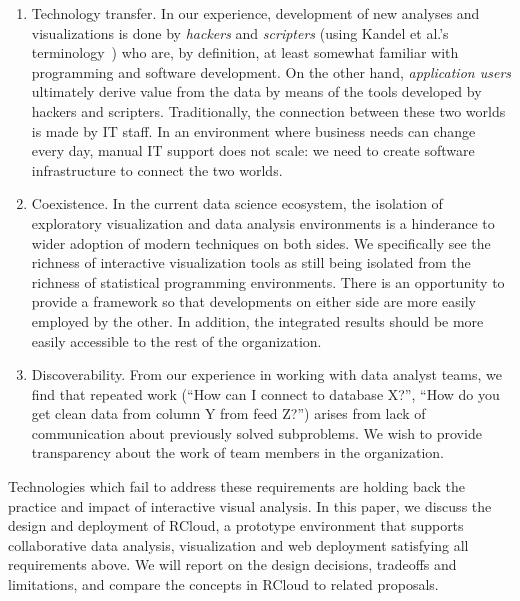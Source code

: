 \begin{enumerate}

\item Technology transfer. In our experience, development
of new analyses and visualizations is done by \emph{hackers}
and \emph{scripters} (using Kandel et al.'s
terminology~\cite{Kandel:2012:EDA}) who are, by definition,
at least somewhat familiar with programming and software development.
On the other hand, \emph{application
users} ultimately derive value from the data by means of the tools
developed by hackers and scripters. Traditionally, the connection
between these two worlds is made by IT staff. In an environment where
business needs can change every day, manual IT support does not scale:
we need to create software infrastructure to connect the two worlds.

\item Coexistence. In the current data science ecosystem, the
isolation of exploratory visualization and data analysis
environments is a hinderance to wider adoption of modern techniques
on both sides. We specifically see the richness of interactive
visualization tools as still being isolated from the richness
of statistical programming environments.
There is an opportunity to provide a framework so that developments
on either side are more easily employed by the other.
In addition, the integrated results should be more easily accessible
to the rest of the organization.

\item Discoverability. From our experience in working with data
analyst teams, we find that repeated work (``How can I connect to
database X?'', ``How do you get clean data from column Y from feed
Z?'') arises from lack of communication about previously solved subproblems.
We wish to provide transparency about the work of team members in the organization.

\end{enumerate}

Technologies which fail to address these requirements
are holding back the practice and impact of interactive visual
analysis. In this paper, we discuss the design and deployment of
RCloud, a prototype environment that supports collaborative data
analysis, visualization and web deployment satisfying all requirements
above. We will report on the design decisions, tradeoffs and
limitations, and compare the concepts in RCloud to related proposals.

